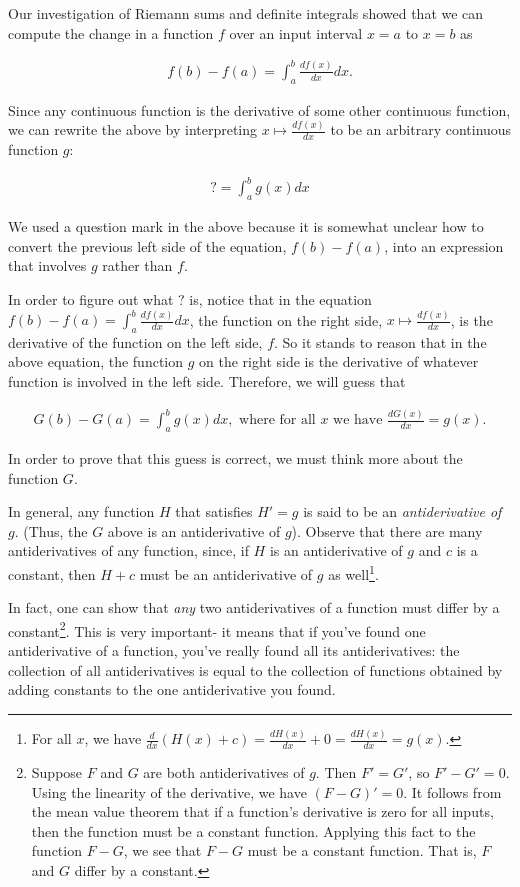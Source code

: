 Our investigation of Riemann sums and definite integrals showed that we can compute the change in a function $f$ over an input interval $x = a$ to $x = b$ as

\begin{align*}
    f(b) - f(a) = \int_a^b \frac{df(x)}{dx} dx.
\end{align*}

Since any continuous function is the derivative of some other continuous function, we can rewrite the above by interpreting $x \mapsto \frac{df(x)}{dx}$ to be an arbitrary continuous function $g$:

\begin{align*}
    ? = \int_a^b g(x) dx
\end{align*}

We used a question mark in the above because it is somewhat unclear how to convert the previous left side of the equation, $f(b) - f(a)$, into an expression that involves $g$ rather than $f$.

In order to figure out what $?$ is, notice that in the equation $f(b) - f(a) = \int_a^b \frac{df(x)}{dx} dx$, the function on the right side, $x \mapsto \frac{df(x)}{dx}$, is the derivative of the function on the left side, $f$. So it stands to reason that in the above equation, the function $g$ on the right side is the derivative of whatever function is involved in the left side. Therefore, we will guess that

\begin{align*}
    G(b) - G(a) = \int_a^b g(x) dx, \text{ where for all $x$ we have $\frac{dG(x)}{dx} = g(x)$}.
\end{align*}

In order to prove that this guess is correct, we must think more about the function $G$.

In general, any function $H$ that satisfies $H' = g$ is said to be an \textit{antiderivative of $g$}. (Thus, the $G$ above is an antiderivative of $g$). Observe that there are many antiderivatives of any function, since, if $H$ is an antiderivative of $g$ and $c$ is a constant, then $H + c$ must be an antiderivative of $g$ as well\footnote{For all $x$, we have $\frac{d}{dx}(H(x) + c) = \frac{dH(x)}{dx} + 0 = \frac{dH(x)}{dx} = g(x)$.}. 

In fact, one can show that \textit{any} two antiderivatives of a function must differ by a constant\footnote{Suppose $F$ and $G$ are both antiderivatives of $g$. Then $F' = G'$, so $F' - G' = 0$. Using the linearity of the derivative, we have $(F - G)' = 0$. It follows from the mean value theorem that if a function's derivative is zero for all inputs, then the function must be a constant function. Applying this fact to the function $F - G$, we see that $F - G$ must be a constant function. That is, $F$ and $G$ differ by a constant.}. This is very important- it means that if you've found one antiderivative of a function, you've really found all its antiderivatives: the collection of all antiderivatives is equal to the collection of functions obtained by adding constants to the one antiderivative you found.

